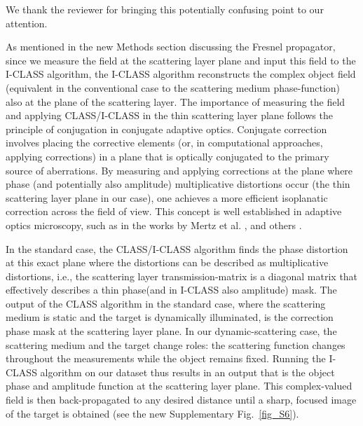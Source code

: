 \documentclass[12pt]{article}
\newcommand{\hlred}[1]{\sethlcolor{red!30}\hl{#1}}
\newenvironment{ourresponse}
    {\begin{tcolorbox}[width=\linewidth,breakable,enhanced,colback=gray!5,colframe=responsecolor!50,title=Response,left=5pt,right=5pt]}
    {\end{tcolorbox}}
\begin{document}
\begin{ourresponse}

    We thank the reviewer for bringing this potentially confusing point to our attention. 
    
    As mentioned in the new Methods section discussing the Fresnel propagator, since we measure the field at the scattering layer plane and input this field to the I-CLASS algorithm, the I-CLASS algorithm reconstructs the complex object field (equivalent in the conventional case to the scattering medium phase-function) also at the plane of the scattering layer. 
    The importance of measuring the field and applying CLASS/I-CLASS in the thin scattering layer plane follows the principle of conjugation in conjugate adaptive optics. Conjugate correction involves placing the corrective elements (or, in computational approaches, applying corrections) in a plane that is optically conjugated to the primary source of aberrations. By measuring and applying corrections at the plane where phase (and potentially also amplitude) multiplicative distortions occur (the thin scattering layer plane in our case), one achieves a more efficient isoplanatic correction across the field of view. This concept is well established in adaptive optics microscopy, such as in the works by Mertz et al. \cite{mertz2015field}, and others  \cite{kwon2023computational, sunray2024beyond}.
    
    In the standard case, the CLASS/I-CLASS algorithm finds the phase distortion at this exact plane where the distortions can be described as multiplicative distortions, i.e., the scattering layer transmission-matrix is a diagonal matrix that effectively describes a thin phase(and in I-CLASS also amplitude) mask.
    The output of the CLASS algorithm in the standard case, where the scattering medium is static and the target is dynamically illuminated, is the correction phase mask at the scattering layer plane. In our dynamic-scattering case, the scattering medium and the target change roles: the scattering function changes throughout the measurements while the object remains fixed. Running the I-CLASS algorithm on our dataset thus results in an output that is the object phase and amplitude function at the scattering layer plane. This complex-valued field is then back-propagated to any desired distance until a sharp, focused image of the target is obtained (see the new Supplementary Fig.~\ref{fig_S6}).


\end{ourresponse}
\end{document}

